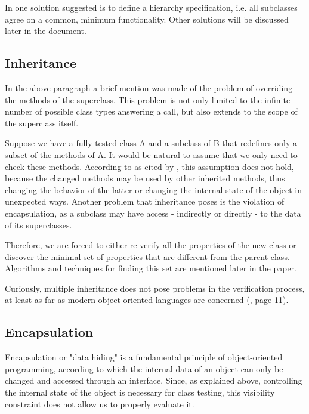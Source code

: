 \documentclass[12pt]{article}
\begin{document}
\par In \textcite{chandra} one solution suggested is to define a hierarchy specification, i.e. all subclasses agree on a common, minimum functionality. Other solutions will be discussed later in the document.

\subsection{Inheritance}

In the above paragraph a brief mention was made of the problem of overriding the methods of the superclass. This problem is not only limited to the infinite number of possible class types answering a call, but also extends to the scope of the superclass itself.

\par Suppose we have a fully tested class A and a subclass of B that redefines only a subset of the methods of A. It would be natural to assume that we only need to check these methods. According to \textcite{perry} as cited by \textcite{barbey}, this assumption does not hold, because the changed methods may be used by other inherited methods, thus changing the behavior of the latter or changing the internal state of the object in unexpected ways. Another problem that inheritance poses is the violation of encapsulation, as a subclass may have access - indirectly or directly - to the data of its superclasses. 

\par Therefore, we are forced to either re-verify all the properties of the new class or discover the minimal set of properties that are different from the parent class. Algorithms and techniques for finding this set are mentioned later in the paper.

\par Curiously, multiple inheritance does not pose problems in the verification process, at least as far as modern object-oriented languages are concerned (\textcite{barbey}, page 11).

\subsection{Encapsulation}

Encapsulation or "data hiding" is a fundamental principle of object-oriented programming, according to which the internal data of an object can only be changed and accessed through an interface. Since, as explained above, controlling the internal state of the object is necessary for class testing, this visibility constraint does not allow us to properly evaluate it. 
\end{document}
